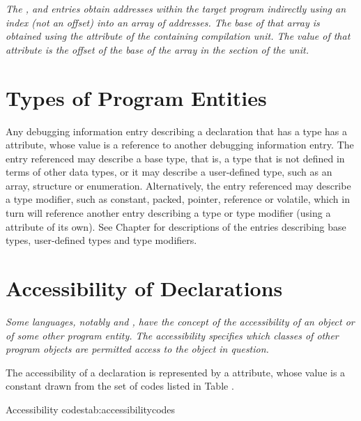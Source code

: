 \textit{The \DWLLEbaseaddressselectionentry, \DWLLEstartendentry{}
and \DWLLEstartlengthentry{} entries obtain addresses within the 
target program indirectly using an index (not an offset) into an 
array of addresses. The base of that array is obtained using the 
\DWATaddrbase{} attribute of the containing compilation unit. 
The value of that attribute is the offset of the base of the array 
in the \dotdebugaddr{} section of the unit.}

\section{Types of Program Entities}
\label{chap:typesofprogramentities}
\hypertarget{chap:DWATtypetypeofdeclaration}{}
Any debugging information entry describing a declaration that
has a type has 
a \DWATtypeDEFN{} attribute, whose value is a
reference to another debugging information entry. The entry
referenced may describe a base type, that is, a type that is
not defined in terms of other data types, or it may describe a
user-defined type, such as an array, structure or enumeration.
Alternatively, the entry referenced may describe a type
modifier, such as constant, packed, pointer, reference or
volatile, which in turn will reference another entry describing
a type or type modifier (using a
\DWATtypeNAME{} attribute of its
own). See 
\bb
Chapter 
\eb
{} 
for descriptions of the entries describing
base types, user-defined types and type modifiers.


\section{Accessibility of Declarations}
\label{chap:accessibilityofdeclarations}
\textit{Some languages, notably  and 
, have the concept of
the accessibility of an object or of some other program
entity. The accessibility specifies which classes of other
program objects are permitted access to the object in question.}

The accessibility of a declaration 
is\hypertarget{chap:DWATaccessibilityattribute}{}
represented by a 
\DWATaccessibilityDEFN{} 
attribute, whose value is a constant drawn from the set of codes 
listed in Table .

\begin{simplenametable}[1.9in]{Accessibility codes}{tab:accessibilitycodes}
\DWACCESSpublicTARG{}          \\
\DWACCESSprivateTARG{}        \\
\DWACCESSprotectedTARG{}    \\
\end{simplenametable}

